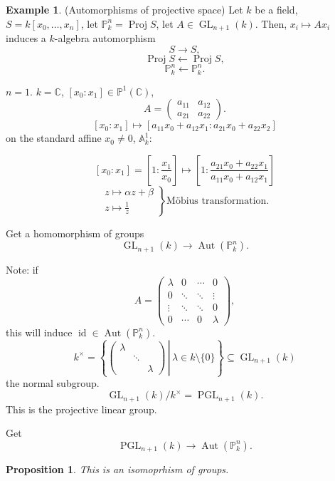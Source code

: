 \documentclass[12pt]{article}
\DeclareMathOperator{\id}{id}
\DeclareMathOperator{\Proj}{Proj}
\DeclareMathOperator{\GL}{GL}
\DeclareMathOperator{\PGL}{PGL}
\DeclareMathOperator{\Aut}{Aut}
\newtheorem*{proposition}{Proposition}
\theoremstyle{definition}
\newtheorem*{example}{Example}
\begin{document}
\begin{example}
(Automorphisms of projective space) Let $k$ be a field, $S=k[x_0,\ldots,x_n]$, let $\mathbb{P}_k^n=\Proj S$, let $A\in\GL_{n+1}(k)$. Then, $x_i\mapsto Ax_i$ induces a $k$-algebra automorphism
\[S\longrightarrow S,\]
\[\Proj S\longleftarrow\Proj S,\]
\[\mathbb{P}_k^n\longleftarrow\mathbb{P}_k^n.\]

$n=1$. $k=\mathbb{C}$, $[x_0:x_1]\in\mathbb{P}^1(\mathbb{C})$,
\[A=\left(\begin{matrix}a_{11}&a_{12}\\a_{21}&a_{22}\end{matrix}\right).\]
\[[x_0:x_1]\longmapsto[a_{11}x_0+a_{12}x_1:a_{21}x_0+a_{22}x_2]\]
on the standard affine $x_0\neq0$, $\mathbb{A}_k^1$:

\[[x_0:x_1]=\left[1:\frac{x_1}{x_0}\right]\longmapsto\left[1:\frac{a_{21}x_0+a_{22}x_1}{a_{11}x_0+a_{12}x_1}\right]\]
\[\left.\begin{array}{l}z\longmapsto\alpha z+\beta\\z\longmapsto\frac{1}{z}\end{array}\right\}\text{M\"{o}bius transformation.}\]

Get a homomorphism of groups
\[\GL_{n+1}(k)\longrightarrow\Aut(\mathbb{P}_k^n).\]

Note: if
\[A=\left(\begin{matrix}\lambda&0&\cdots&0\\0&\ddots&\ddots&\vdots\\\vdots&\ddots&\ddots&0\\0&\cdots&0&\lambda\end{matrix}\right),\]
this will induce $\id\in\Aut(\mathbb{P}_k^n)$.
\[k^{\times}=\left\{\left.\left(\begin{matrix}\lambda\\&\ddots\\&&\lambda\end{matrix}\right)\,\right|\,\lambda\in k\setminus\{0\}\right\}\subseteq\GL_{n+1}(k)\]
the normal subgroup.
\[\GL_{n+1}(k)/k^{\times}=\PGL_{n+1}(k).\]
This is the projective linear group.

Get
\[\PGL_{n+1}(k)\longrightarrow\Aut(\mathbb{P}_k^n).\]

\begin{proposition}
This is an isomoprhism of groups.
\end{proposition}


\end{example}
\end{document}
